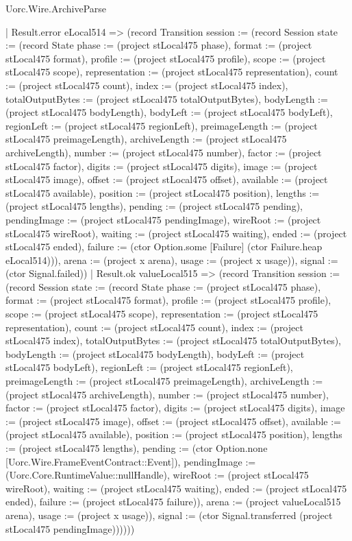 \begin{lexlean}{Uorc.Wire.ArchiveParse}
\begin{semanticmodule}
{            | Result.error eLocal514 => (record Transition {session := (record Session {state := (record State {phase := (project stLocal475 phase), format := (project stLocal475 format), profile := (project stLocal475 profile), scope := (project stLocal475 scope), representation := (project stLocal475 representation), count := (project stLocal475 count), index := (project stLocal475 index), totalOutputBytes := (project stLocal475 totalOutputBytes), bodyLength := (project stLocal475 bodyLength), bodyLeft := (project stLocal475 bodyLeft), regionLeft := (project stLocal475 regionLeft), preimageLength := (project stLocal475 preimageLength), archiveLength := (project stLocal475 archiveLength), number := (project stLocal475 number), factor := (project stLocal475 factor), digits := (project stLocal475 digits), image := (project stLocal475 image), offset := (project stLocal475 offset), available := (project stLocal475 available), position := (project stLocal475 position), lengths := (project stLocal475 lengths), pending := (project stLocal475 pending), pendingImage := (project stLocal475 pendingImage), wireRoot := (project stLocal475 wireRoot), waiting := (project stLocal475 waiting), ended := (project stLocal475 ended), failure := (ctor Option.some [Failure] (ctor Failure.heap eLocal514))}), arena := (project x arena), usage := (project x usage)}), signal := (ctor Signal.failed)})
            | Result.ok valueLocal515 => (record Transition {session := (record Session {state := (record State {phase := (project stLocal475 phase), format := (project stLocal475 format), profile := (project stLocal475 profile), scope := (project stLocal475 scope), representation := (project stLocal475 representation), count := (project stLocal475 count), index := (project stLocal475 index), totalOutputBytes := (project stLocal475 totalOutputBytes), bodyLength := (project stLocal475 bodyLength), bodyLeft := (project stLocal475 bodyLeft), regionLeft := (project stLocal475 regionLeft), preimageLength := (project stLocal475 preimageLength), archiveLength := (project stLocal475 archiveLength), number := (project stLocal475 number), factor := (project stLocal475 factor), digits := (project stLocal475 digits), image := (project stLocal475 image), offset := (project stLocal475 offset), available := (project stLocal475 available), position := (project stLocal475 position), lengths := (project stLocal475 lengths), pending := (ctor Option.none [Uorc.Wire.FrameEventContract::Event]), pendingImage := (Uorc.Core.RuntimeValue::nullHandle), wireRoot := (project stLocal475 wireRoot), waiting := (project stLocal475 waiting), ended := (project stLocal475 ended), failure := (project stLocal475 failure)}), arena := (project valueLocal515 arena), usage := (project x usage)}), signal := (ctor Signal.transferred (project stLocal475 pendingImage))}))))
}
\end{semanticmodule}
\end{lexlean}
